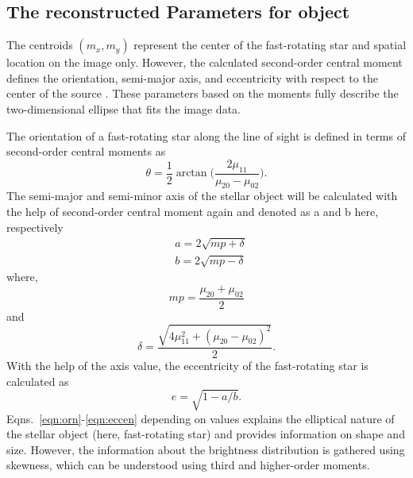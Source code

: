 \subsection{The reconstructed Parameters for object}
The centroids $(m_x, m_y)$ represent the center of the fast-rotating star and spatial location on the image only. However, the calculated second-order central moment defines the orientation, semi-major axis, and eccentricity with respect to the center of the source \citep{teague1980image}. These parameters based on the moments fully describe the two-dimensional ellipse that fits the image data. 

The orientation of a fast-rotating star along the line of sight is defined in terms of second-order central moments as
\begin{equation}
	\theta = \frac{1}{2}\arctan \big(\frac{2\mu_{11}}{\mu_{20} - \mu_{02}}\big).
	\label{eqn:orn}
\end{equation}
The semi-major and semi-minor axis of the stellar object will be calculated with the help of second-order central moment again and denoted as a and b here, respectively
\begin{equation}
	\begin{aligned}
		&a = 2\sqrt{mp + \delta} \\
		&b = 2\sqrt{mp - \delta}
	\end{aligned}
	\label{eqn:semi}
\end{equation}
where,
\begin{equation}
	mp = \frac{\mu_{20} + \mu_{02}}{2}
	\label{eqn:mp}
\end{equation}
and
\begin{equation}
	\delta = \frac{\sqrt{4\mu_{11}^2 + (\mu_{20} - \mu_{02})^2}}{2}.	
	\label{eqn:delta}
\end{equation}
With the help of the axis value, the eccentricity of the fast-rotating star is calculated as
\begin{equation}
	e = \sqrt{1 - a/b}.
	\label{eqn:eccen}
\end{equation}
Eqns.~\ref{eqn:orn}-\ref{eqn:eccen} depending on values explains the elliptical nature of the stellar object (here, fast-rotating star) and provides information on shape and size. However, the information about the brightness distribution is gathered using skewness, which can be understood using third and higher-order moments.
